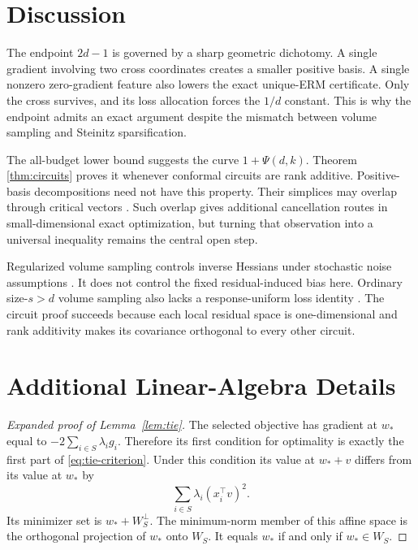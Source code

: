 \documentclass[twoside]{article}
\begin{document}
\section{Discussion}

The endpoint $2d-1$ is governed by a sharp geometric dichotomy. A single gradient involving two cross coordinates creates a smaller positive basis. A single nonzero zero-gradient feature also lowers the exact unique-ERM certificate. Only the cross survives, and its loss allocation forces the $1/d$ constant. This is why the endpoint admits an exact argument despite the mismatch between volume sampling and Steinitz sparsification.

The all-budget lower bound suggests the curve $1+\Psi(d,k)$. Theorem \ref{thm:circuits} proves it whenever conformal circuits are rank additive. Positive-basis decompositions need not have this property. Their simplices may overlap through critical vectors \citep{schoch2020simplicial, hare2021positive}. Such overlap gives additional cancellation routes in small-dimensional exact optimization, but turning that observation into a universal inequality remains the central open step.

Regularized volume sampling controls inverse Hessians under stochastic noise assumptions \citep{derezinski2018ridge}. It does not control the fixed residual-induced bias here. Ordinary size-$s>d$ volume sampling also lacks a response-uniform loss identity \citep{derezinski2018reverse}. The circuit proof succeeds because each local residual space is one-dimensional and rank additivity makes its covariance orthogonal to every other circuit.



\appendix

\section{Additional Linear-Algebra Details}

\begin{proof}[Expanded proof of Lemma~\ref{lem:tie}]
The selected objective has gradient at $w_*$ equal to $-2\sum_{i\in S}\lambda_i g_i$. Therefore its first condition for optimality is exactly the first part of \eqref{eq:tie-criterion}. Under this condition its value at $w_*+v$ differs from its value at $w_*$ by
\begin{equation}
 \sum_{i\in S}\lambda_i(x_i^\top v)^2.
\end{equation}
Its minimizer set is $w_*+W_S^\perp$. The minimum-norm member of this affine space is the orthogonal projection of $w_*$ onto $W_S$. It equals $w_*$ if and only if $w_*\in W_S$.
\end{proof}
\end{document}
